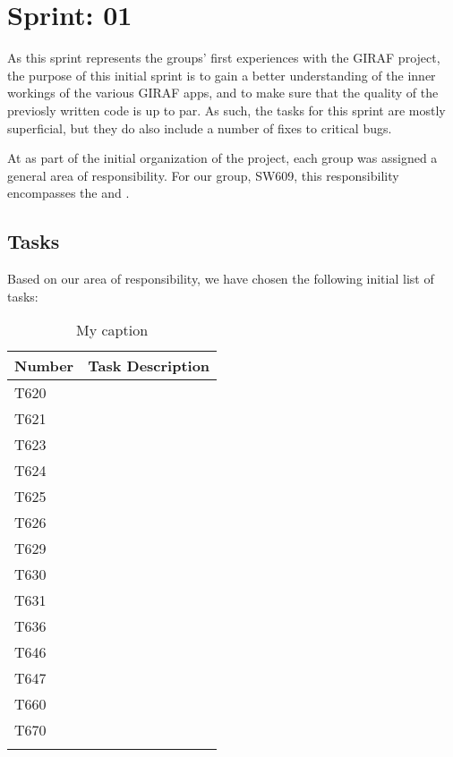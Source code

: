 \chapter{Sprint: 01}
As this sprint represents the groups' first experiences with the GIRAF
project, the purpose of this initial sprint is to gain a better understanding of
the inner workings of the various GIRAF apps, and to make sure that the quality
of the previosly written code is up to par. As such, the tasks for this sprint
are mostly superficial, but they do also include a number of fixes to critical
bugs.\nl

At as part of the initial organization of the project, each group was assigned a
general area of responsibility. For our group, SW609, this responsibility
encompasses the  and .

\section{Tasks}
Based on our area of responsibility, we have chosen the following initial list
of tasks:

\begin{table}[]
\centering
\caption{My caption}
\label{my-label}
\begin{tabular}{|l|l|}
\hline
Number 			& Task Description \\ \hline
T620  			&                  \\ \hline
T621    	   	&                  \\ \hline
T623	       	&                  \\ \hline
T624    	   	&                  \\ \hline
T625   	   		&                  \\ \hline
T626   	   		&                  \\ \hline
T629  	   		&				   \\ \hline
T630       		&                  \\ \hline
T631       		&                  \\ \hline
T636       		&                  \\ \hline
T646       		&                  \\ \hline
T647       		&                  \\ \hline
T660       		&                  \\ \hline
T670       		&                  \\ \hline
       			&                  \\ \hline
\end{tabular}
\end{table}








